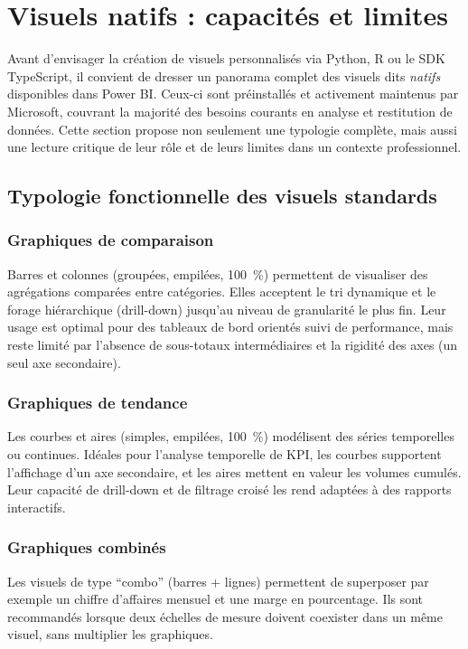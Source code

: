 \section{Visuels natifs : capacités et limites}
\label{sec:natifs-powerbi}

Avant d'envisager la création de visuels personnalisés via Python, R ou le SDK TypeScript, il convient de dresser un panorama complet des visuels dits \emph{natifs} disponibles dans Power BI. Ceux-ci sont préinstallés et activement maintenus par Microsoft, couvrant la majorité des besoins courants en analyse et restitution de données. Cette section propose non seulement une typologie complète, mais aussi une lecture critique de leur rôle et de leurs limites dans un contexte professionnel.

\subsection{Typologie fonctionnelle des visuels standards}

\subsubsection{Graphiques de comparaison}
Barres et colonnes (groupées, empilées, 100~\%) permettent de visualiser des agrégations comparées entre catégories. Elles acceptent le tri dynamique et le forage hiérarchique (drill-down) jusqu'au niveau de granularité le plus fin. Leur usage est optimal pour des tableaux de bord orientés suivi de performance, mais reste limité par l'absence de sous-totaux intermédiaires et la rigidité des axes (un seul axe secondaire).

\subsubsection{Graphiques de tendance}
Les courbes et aires (simples, empilées, 100~\%) modélisent des séries temporelles ou continues. Idéales pour l'analyse temporelle de KPI, les courbes supportent l'affichage d'un axe secondaire, et les aires mettent en valeur les volumes cumulés. Leur capacité de drill-down et de filtrage croisé les rend adaptées à des rapports interactifs.

\subsubsection{Graphiques combinés}
Les visuels de type ``combo'' (barres + lignes) permettent de superposer par exemple un chiffre d'affaires mensuel et une marge en pourcentage. Ils sont recommandés lorsque deux échelles de mesure doivent coexister dans un même visuel, sans multiplier les graphiques.

